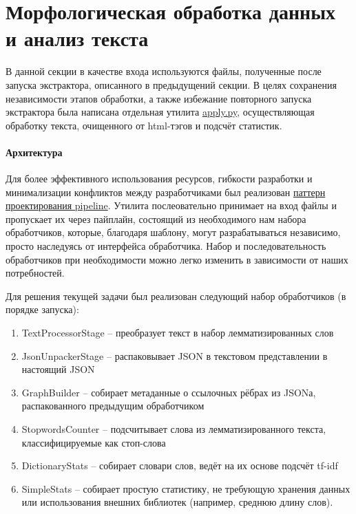 \section{Морфологическая обработка данных и анализ текста}

В данной секции в качестве входа используются файлы, полученные после запуска экстрактора, описанного в предыдущений секции. В целях сохранения независимости этапов обработки, а также избежание повторного запуска экстрактора была написана отдельная утилита \href{https://github.com/vasalf/hse-web-search-homework/blob/master/1/apply.py}{apply.py}, осуществляющая обработку текста, очищенного от html-тэгов и подсчёт статистик. 

\paragraph{Архитектура}

Для более эффективного использования ресурсов, гибкости разработки и минимализации конфликтов между разработчиками был реализован \href{https://refactoring.guru/ru/design-patterns/chain-of-responsibility}{паттерн проектирования pipeline}. Утилита послеовательно принимает на вход файлы и пропускает их через пайплайн, состоящий из необходимого нам набора обработчиков, которые, благодаря шаблону, могут разрабатываться независимо, просто наследуясь от интерфейса обработчика. Набор и последовательность обработчиков при необходимости можно легко изменить в зависимости от наших потребностей.

Для решения текущей задачи был реализован следующий набор обработчиков (в порядке запуска):

\begin{enumerate}
	\item TextProcessorStage -- преобразует текст в набор лемматизированных слов
	\item JsonUnpackerStage -- распаковывает JSON в текстовом представлении в настоящий JSON
	\item GraphBuilder -- собирает метаданные о ссылочных рёбрах из JSONа, распакованного предыдущим обработчиком
	\item StopwordsCounter -- подсчитывает слова из лемматизированного текста, классифицируемые как стоп-слова 
	\item DictionaryStats -- собирает словари слов, ведёт на их основе подсчёт tf-idf
	\item SimpleStats -- собирает простую статистику, не требующую хранения данных или использования внешних библиотек (например, среднюю длину слов).	
\end{enumerate}

